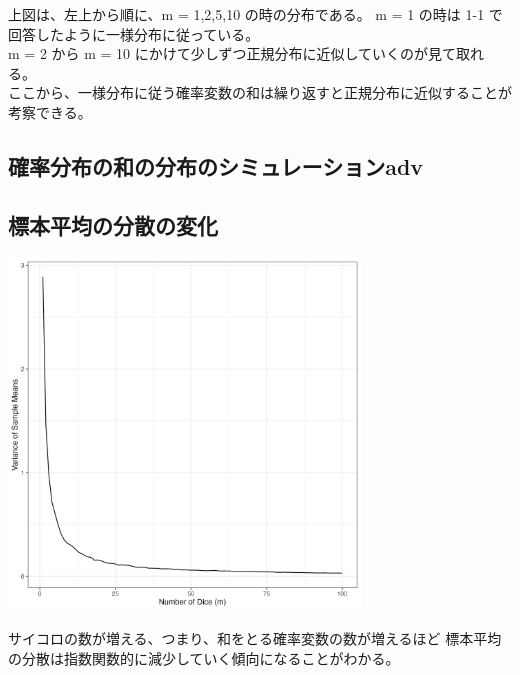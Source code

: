 \documentclass{article}
\begin{document}
上図は、左上から順に、m = 1,2,5,10 の時の分布である。 
m = 1 の時は 1-1 で回答したように一様分布に従っている。\\
m = 2 から m = 10 にかけて少しずつ正規分布に近似していくのが見て取れる。\\
ここから、一様分布に従う確率変数の和は繰り返すと正規分布に近似することが考察できる。

\subsection{確率分布の和の分布のシミュレーションadv}

\subsection{標本平均の分散の変化}
	\begin{center}
		\includegraphics[width=0.7\textwidth]{1-4_plot.png}
	\end{center}

サイコロの数が増える、つまり、和をとる確率変数の数が増えるほど
標本平均の分散は指数関数的に減少していく傾向になることがわかる。
\end{document}
